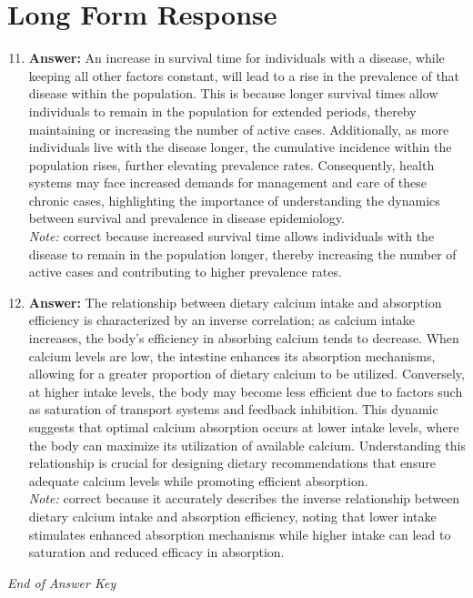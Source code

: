 \documentclass[12pt]{article}
\begin{document}
\section*{Long Form Response}
\begin{enumerate}[label=\arabic*.]
\setcounter{enumi}{10}
\item \textbf{Answer:} An increase in survival time for individuals with a disease, while keeping all other factors constant, will lead to a rise in the prevalence of that disease within the population. This is because longer survival times allow individuals to remain in the population for extended periods, thereby maintaining or increasing the number of active cases. Additionally, as more individuals live with the disease longer, the cumulative incidence within the population rises, further elevating prevalence rates. Consequently, health systems may face increased demands for management and care of these chronic cases, highlighting the importance of understanding the dynamics between survival and prevalence in disease epidemiology.
\\ \textit{Note:} correct because increased survival time allows individuals with the disease to remain in the population longer, thereby increasing the number of active cases and contributing to higher prevalence rates.
\item \textbf{Answer:} The relationship between dietary calcium intake and absorption efficiency is characterized by an inverse correlation; as calcium intake increases, the body's efficiency in absorbing calcium tends to decrease. When calcium levels are low, the intestine enhances its absorption mechanisms, allowing for a greater proportion of dietary calcium to be utilized. Conversely, at higher intake levels, the body may become less efficient due to factors such as saturation of transport systems and feedback inhibition. This dynamic suggests that optimal calcium absorption occurs at lower intake levels, where the body can maximize its utilization of available calcium. Understanding this relationship is crucial for designing dietary recommendations that ensure adequate calcium levels while promoting efficient absorption.
\\ \textit{Note:} correct because it accurately describes the inverse relationship between dietary calcium intake and absorption efficiency, noting that lower intake stimulates enhanced absorption mechanisms while higher intake can lead to saturation and reduced efficacy in absorption.
\end{enumerate}

\vfill
\noindent\textit{End of Answer Key}
\end{document}
